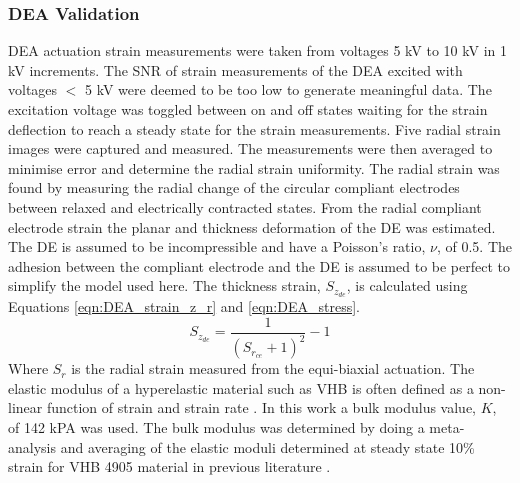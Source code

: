 	\subsubsection{DEA Validation} %
	\label{subsubsec:dea_validation1}
	DEA actuation strain measurements were taken from voltages 5 kV to 10 kV in 1 kV increments. The SNR of strain measurements of the DEA excited with voltages $<$ 5 kV were deemed to be too low to generate meaningful data. The excitation voltage was toggled between on and off states waiting for the strain deflection to reach a steady state for the strain measurements. Five radial strain images were captured and measured. The measurements were then averaged to minimise error and determine the radial strain uniformity. The radial strain was found by measuring the radial change of the circular compliant electrodes between relaxed and electrically contracted states. From the radial compliant electrode strain the planar and thickness deformation of the DE was estimated. The DE is assumed to be incompressible and have a Poisson's ratio, $\nu$, of 0.5. The adhesion between the compliant electrode and the DE is assumed to be perfect to simplify the model used here. The thickness strain, $S_{z_{de}}$, is calculated using Equations \ref{eqn:DEA_strain_z_r}\cite{Carpi2015} and \ref{eqn:DEA_stress}.
	\begin{equation}
		S_{z_{de}} = \frac{1}{(S_{r_{ce}} + 1)^2} - 1
		\label{eqn:DEA_strain_z_r}
	\end{equation}
	Where $S_r$ is the radial strain measured from the equi-biaxial actuation. 
	The elastic modulus of a hyperelastic material such as VHB is often defined as a non-linear function of strain and strain rate\cite{Liu2018} . In this work a bulk modulus value, $K$, of 142 kPA was used. The bulk modulus was determined by doing a meta-analysis and averaging of the elastic moduli determined at steady state 10\% strain for VHB 4905 material in previous literature\cite{Liu2018, Helal2018, Huang2023} .
